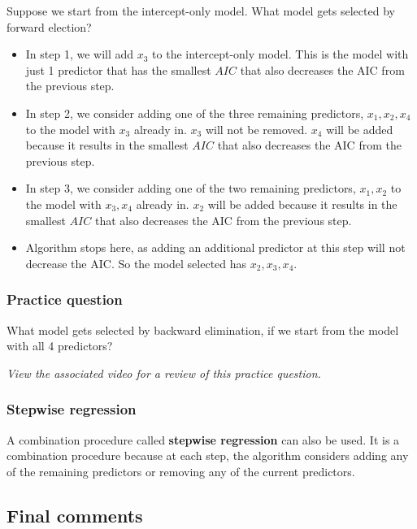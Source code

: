 \documentclass[
]{book}
\providecommand{\tightlist}{%
  \setlength{\itemsep}{0pt}\setlength{\parskip}{0pt}}
\begin{document}
Suppose we start from the intercept-only model. What model gets selected by forward election?

\begin{itemize}
\tightlist
\item
  In step 1, we will add \(x_3\) to the intercept-only model. This is the model with just 1 predictor that has the smallest \(AIC\) that also decreases the AIC from the previous step.
\item
  In step 2, we consider adding one of the three remaining predictors, \(x_1, x_2, x_4\) to the model with \(x_3\) already in. \(x_3\) will not be removed. \(x_4\) will be added because it results in the smallest \(AIC\) that also decreases the AIC from the previous step.
\item
  In step 3, we consider adding one of the two remaining predictors, \(x_1, x_2\) to the model with \(x_3, x_4\) already in. \(x_2\) will be added because it results in the smallest \(AIC\) that also decreases the AIC from the previous step.
\item
  Algorithm stops here, as adding an additional predictor at this step will not decrease the AIC. So the model selected has \(x_2, x_3, x_4\).
\end{itemize}

\hypertarget{practice-question-1}{%
\subsubsection{Practice question}\label{practice-question-1}}

What model gets selected by backward elimination, if we start from the model with all 4 predictors?

\emph{View the associated video for a review of this practice question.}

\hypertarget{stepwise-regression}{%
\subsubsection{Stepwise regression}\label{stepwise-regression}}

A combination procedure called \textbf{stepwise regression} can also be used. It is a combination procedure because at each step, the algorithm considers adding any of the remaining predictors or removing any of the current predictors.

\hypertarget{final-comments}{%
\subsection{Final comments}\label{final-comments}}
\end{document}

